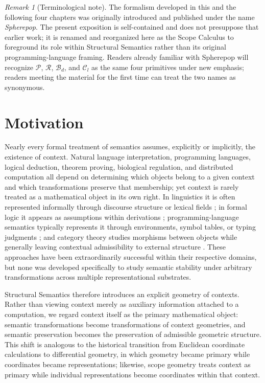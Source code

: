 \documentclass[11pt,twoside,openright]{book}
\numberwithin{equation}{chapter}
\theoremstyle{definition}
\theoremstyle{plain}
\theoremstyle{remark}
\newtheorem{remark}[definition]{Remark}
\theoremstyle{definition}
\newcommand{\Pop}{\mathcal{P}}
\newcommand{\Refuse}{\mathcal{R}}
\newcommand{\Bind}{\mathcal{B}_d}
\newcommand{\Collapse}{\mathcal{C}_l}
\begin{document}
\begin{remark}[Terminological note]
The formalism developed in this and the following four chapters was
originally introduced and published under the name \emph{Spherepop}. The
present exposition is self-contained and does not presuppose that
earlier work; it is renamed and reorganized here as the Scope Calculus to
foreground its role within Structural Semantics rather than its original
programming-language framing. Readers already familiar with Spherepop
will recognize $\Pop$, $\Refuse$, $\Bind$, and $\Collapse$ as the same
four primitives under new emphasis; readers meeting the material for the
first time can treat the two names as synonymous.
\end{remark}

\section{Motivation}

Nearly every formal treatment of semantics assumes, explicitly or
implicitly, the existence of context. Natural language interpretation,
programming languages, logical deduction, theorem proving, biological
regulation, and distributed computation all depend on determining which
objects belong to a given context and which transformations preserve that
membership; yet context is rarely treated as a mathematical object in its
own right. In linguistics it is often represented informally through
discourse structure or lexical fields \cite{Lyons1977,Saussure1916}; in
formal logic it appears as assumptions within derivations
\cite{Gentzen1935}; programming-language semantics typically represents
it through environments, symbol tables, or typing judgments
\cite{Winskel1993,Pierce2002}; and category theory studies morphisms
between objects while generally leaving contextual admissibility to
external structure \cite{MacLane1998}. These approaches have been
extraordinarily successful within their respective domains, but none was
developed specifically to study semantic stability under arbitrary
transformations across multiple representational substrates.

Structural Semantics therefore introduces an explicit geometry of
contexts. Rather than viewing context merely as auxiliary information
attached to a computation, we regard context itself as the primary
mathematical object: semantic transformations become transformations of
context geometries, and semantic preservation becomes the preservation of
admissible geometric structure. This shift is analogous to the historical
transition from Euclidean coordinate calculations to differential
geometry, in which geometry became primary while coordinates became
representations; likewise, scope geometry treats context as primary while
individual representations become coordinates within that context.
\end{document}
